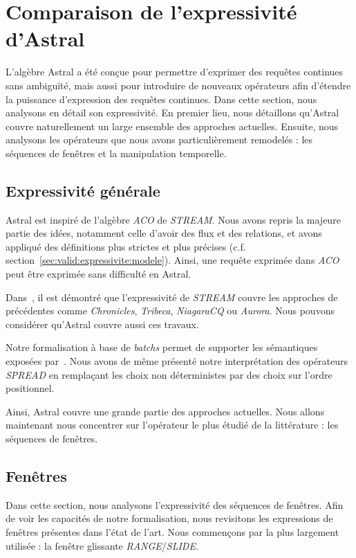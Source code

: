 \section{Comparaison de l'expressivité d'Astral}\label{sec:valid:expressivite:comparaison}
L'algèbre Astral a été conçue pour permettre d'exprimer des requêtes continues sans ambiguïté, mais aussi pour introduire de nouveaux opérateurs afin d'étendre la puissance d'expression des requêtes continues. Dans cette section, nous analysons en détail son expressivité. En premier lieu, nous détaillons qu'Astral couvre naturellement un large ensemble des approches actuelles. Ensuite, nous analysons les opérateurs que nous avons particulièrement remodelés : les séquences de fenêtres et la manipulation temporelle.

\subsection{Expressivité générale}
Astral est inspiré de l'algèbre \textit{ACO} de \textit{STREAM}. Nous avons repris la majeure partie des idées, notamment celle d'avoir des flux et des relations, et avons appliqué des définitions plus strictes et plus précises (c.f. section~\ref{sec:valid:expressivite:modele}). Ainsi, une requête exprimée dans \textit{ACO} peut être exprimée sans difficulté en Astral.

Dans~\cite{Arasu:stream}, il est démontré que l'expressivité de \textit{STREAM} couvre les approches de précédentes comme \textit{Chronicles}, \textit{Tribeca}, \textit{NiagaraCQ} ou \textit{Aurora}. Nous pouvons considérer qu'Astral couvre aussi ces travaux.

Notre formalisation à base de \textit{batchs} permet de supporter les sémantiques exposées par~\cite{Jain:spread}. Nous avons de même présenté notre interprétation des opérateurs \textit{SPREAD} en remplaçant les choix non déterministes par des choix sur l'ordre positionnel.

Ainsi, Astral couvre une grande partie des approches actuelles. Nous allons maintenant nous concentrer sur l'opérateur le plus étudié de la littérature : les séquences de fenêtres.

\subsection{Fenêtres}
Dans cette section, nous analysons l'expressivité des séquences de fenêtres. Afin de voir les capacités de notre formalisation, nous revisitons les expressions de fenêtres présentes dans l'état de l'art. Nous commençons par la plus largement utilisée : la fenêtre glissante \textit{RANGE}/\textit{SLIDE}.
